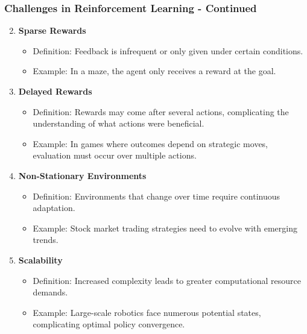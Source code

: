 \documentclass[aspectratio=169]{beamer}
\begin{document}
\begin{frame}[fragile]
    \frametitle{Challenges in Reinforcement Learning - Continued}
    \begin{enumerate}
        \setcounter{enumi}{1} %
        \item \textbf{Sparse Rewards}
        \begin{itemize}
            \item Definition: Feedback is infrequent or only given under certain conditions.
            \item Example: In a maze, the agent only receives a reward at the goal.
        \end{itemize}
        
        \item \textbf{Delayed Rewards}
        \begin{itemize}
            \item Definition: Rewards may come after several actions, complicating the understanding of what actions were beneficial.
            \item Example: In games where outcomes depend on strategic moves, evaluation must occur over multiple actions.
        \end{itemize}
        
        \item \textbf{Non-Stationary Environments}
        \begin{itemize}
            \item Definition: Environments that change over time require continuous adaptation.
            \item Example: Stock market trading strategies need to evolve with emerging trends.
        \end{itemize}
        
        \item \textbf{Scalability}
        \begin{itemize}
            \item Definition: Increased complexity leads to greater computational resource demands.
            \item Example: Large-scale robotics face numerous potential states, complicating optimal policy convergence.
        \end{itemize}
    \end{enumerate}
\end{frame}
\end{document}
